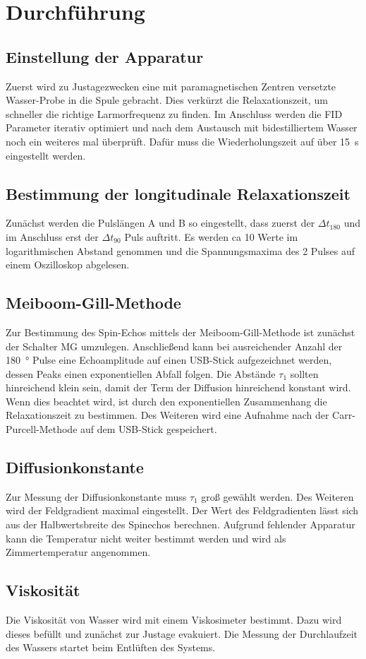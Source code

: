 \section{Durchführung}%
\label{sec:durchfuehrung}

\subsection{Einstellung der Apparatur}%
\label{sub:einstellung_der_apparatur}

Zuerst wird zu Justagezwecken eine mit paramagnetischen Zentren versetzte
Wasser-Probe in die Spule gebracht.
Dies verkürzt die Relaxationszeit, um schneller die richtige Larmorfrequenz zu finden. 
Im Anschluss werden die FID Parameter iterativ optimiert und nach dem Austausch
mit bidestilliertem Wasser noch ein weiteres mal überprüft. 
Dafür muss die Wiederholungszeit auf über \SI{15}{\second} eingestellt werden.

\subsection{Bestimmung der longitudinale Relaxationszeit}%
\label{sub:bestimmung_der_longitudinale_relaxationszeit}
Zunächst werden die Pulslängen A und B so eingestellt, dass zuerst der 
$\Delta t_{180}$ und im Anschluss erst der $\Delta t_{90}$ Puls auftritt. 
Es werden ca 10 Werte im logarithmischen Abstand genommen und die
Spannungsmaxima des 2 Pulses auf einem Oszilloskop abgelesen.

\subsection{Meiboom-Gill-Methode}%
\label{sub:meiboom_gill_methode}
Zur Bestimmung des Spin-Echos mittels der Meiboom-Gill-Methode ist zunächst der
Schalter MG umzulegen. Anschließend kann bei ausreichender Anzahl der \SI{180}{\degree}
Pulse eine Echoamplitude auf einen USB-Stick aufgezeichnet werden, dessen Peaks einen
exponentiellen Abfall folgen. 
Die Abstände $\tau_1$ sollten hinreichend klein sein, damit der Term der
Diffusion hinreichend konstant wird.
Wenn dies beachtet wird, ist durch den exponentiellen Zusammenhang die
Relaxationszeit zu bestimmen. 
Des Weiteren wird eine Aufnahme nach der Carr-Purcell-Methode auf
dem USB-Stick gespeichert.

\subsection{Diffusionkonstante}%
\label{sub:diffusionskonstante}
Zur Messung der Diffusionkonstante muss $\tau_1$ groß gewählt werden. 
Des Weiteren wird der Feldgradient maximal eingestellt.
Der Wert des Feldgradienten lässt sich aus der Halbwertsbreite des Spinechos
berechnen.
Aufgrund fehlender Apparatur kann die Temperatur nicht weiter bestimmt werden
und wird als Zimmertemperatur angenommen. 

\subsection{Viskosität}
Die Viskosität von Wasser wird mit einem Viskosimeter bestimmt. Dazu wird
dieses befüllt und zunächst zur Justage evakuiert.
Die Messung der Durchlaufzeit des Wassers startet beim Entlüften des
Systems. 
